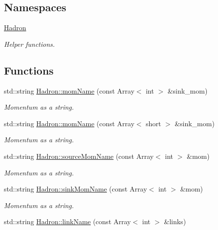 \subsection*{Namespaces}
\begin{DoxyCompactItemize}
\item 
 \mbox{\hyperlink{namespaceHadron}{Hadron}}
\begin{DoxyCompactList}\small\item\em Helper functions. \end{DoxyCompactList}\end{DoxyCompactItemize}
\subsection*{Functions}
\begin{DoxyCompactItemize}
\item 
std\+::string \mbox{\hyperlink{namespaceHadron_ad1ac646aa2d410cc55e4b11c925867a6}{Hadron\+::mom\+Name}} (const Array$<$ int $>$ \&sink\+\_\+mom)
\begin{DoxyCompactList}\small\item\em Momentum as a string. \end{DoxyCompactList}\item 
std\+::string \mbox{\hyperlink{namespaceHadron_aaac56034a899893bfbd130cdd0427018}{Hadron\+::mom\+Name}} (const Array$<$ short $>$ \&sink\+\_\+mom)
\begin{DoxyCompactList}\small\item\em Momentum as a string. \end{DoxyCompactList}\item 
std\+::string \mbox{\hyperlink{namespaceHadron_addad39b9d17263485541d757bb712420}{Hadron\+::source\+Mom\+Name}} (const Array$<$ int $>$ \&mom)
\begin{DoxyCompactList}\small\item\em Momentum as a string. \end{DoxyCompactList}\item 
std\+::string \mbox{\hyperlink{namespaceHadron_aaa6ace3b1a5c63de278a8bcb9fa80c49}{Hadron\+::sink\+Mom\+Name}} (const Array$<$ int $>$ \&mom)
\begin{DoxyCompactList}\small\item\em Momentum as a string. \end{DoxyCompactList}\item 
std\+::string \mbox{\hyperlink{namespaceHadron_afbb540812e62aedb8826e62c56efcff8}{Hadron\+::link\+Name}} (const Array$<$ int $>$ \&links)

\end{DoxyCompactItemize}
